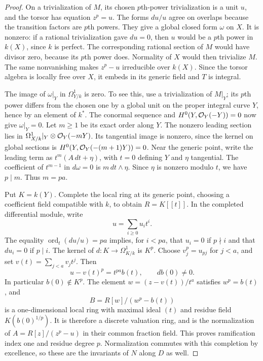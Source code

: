 \begin{proof}
On a trivialization of $M$, its chosen $p$th-power trivialization is a
unit $u$, and the torsor has equation $z^p=u$. The forms $du/u$ agree
on overlaps because the transition factors are $p$th powers. They give
a global closed form $\omega$ on $X$. It is nonzero: if a rational
trivialization gave $du=0$, then $u$ would be a $p$th power in $k(X)$,
since $k$ is perfect. The corresponding rational section of $M$ would
have divisor zero, because its $p$th power does. Normality of $X$ would
then trivialize $M$. The same nonvanishing makes $z^p-u$ irreducible
over $k(X)$. Since the torsor algebra is locally free over $X$, it
embeds in its generic field and $T$ is integral.

The image of $\omega|_Y$ in $\Omega^1_{Y/k}$ is zero. To see this,
use a trivialization of $M|_Y$; its $p$th power differs from the chosen
one by a global unit on the proper integral curve $Y$, hence by an
element of $k^*$. The conormal sequence and
$H^0(Y,\mathcal O_Y(-Y))=0$ now give $\omega|_Y=0$.
Let $m\geq1$ be its exact order along $Y$. The nonzero leading section
lies in $\Omega^1_{X/k}|_Y\otimes\mathcal O_Y(-mY)$. Its tangential image
is nonzero, since the kernel on global sections is
$H^0(Y,\mathcal O_Y(-(m+1)Y))=0$. Near the generic point, write the leading
term as $t^m(A\,dt+\eta)$, with $t=0$ defining $Y$ and $\eta$ tangential.
The coefficient of $t^{m-1}$ in $d\omega=0$ is
$m\,dt\wedge\eta$. Since $\eta$ is nonzero modulo $t$, we have
$p\mid m$. Thus $m=pa$.

Put $K=k(Y)$. Complete the local ring at its generic point, choosing a
coefficient field compatible with $k$, to obtain $R=K[[t]]$. In the
completed differential module, write
\[
 u=\sum_{i\geq0}u_it^i.
\]
The equality $\operatorname{ord}_t(du/u)=pa$ implies, for $i<pa$,
that $u_i=0$ if $p\nmid i$ and that $du_i=0$ if $p\mid i$.
The kernel of $d:K\to\Omega^1_{K/k}$ is $K^p$. Choose
$v_j^p=u_{pj}$ for $j<a$, and set $v(t)=\sum_{j<a}v_jt^j$. Then
\[
 u-v(t)^p=t^{pa}b(t),\qquad db(0)\ne0.
\]
In particular $b(0)\notin K^p$. The element
$w=(z-v(t))/t^a$ satisfies $w^p=b(t)$, and
\[
 B=R[w]/(w^p-b(t))
\]
is a one-dimensional local ring with maximal ideal $(t)$ and residue
field $K(b(0)^{1/p})$. It is therefore a discrete valuation ring, and
is the normalization of $A=R[z]/(z^p-u)$ in their common fraction field.
This proves ramification index one and residue degree $p$. Normalization
commutes with this completion by excellence, so these are the invariants
of $N$ along $D$ as well.


\end{proof}

